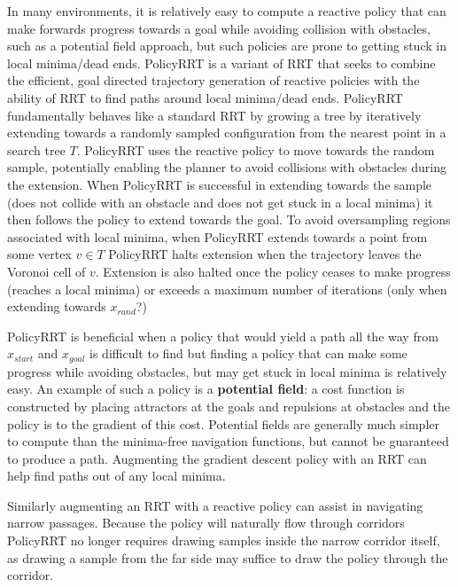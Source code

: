 \documentclass[../thesis.tex]{subfiles}
\begin{document}
In many environments, it is relatively easy to compute a reactive policy that can make forwards progress towards a goal while avoiding collision with obstacles, such as a potential field approach, but such policies are prone to getting stuck in local minima/dead ends.  PolicyRRT is a variant of RRT that seeks to combine the efficient, goal directed trajectory generation of reactive policies with the ability of RRT to find paths around local minima/dead ends.  PolicyRRT fundamentally behaves like a standard RRT by growing a tree by iteratively extending towards a randomly sampled configuration from the nearest point in a search tree $T$.  PolicyRRT uses the reactive policy to move towards the random sample, potentially enabling the planner to avoid collisions with obstacles during the extension.  When PolicyRRT is successful in extending towards the sample (does not collide with an obstacle and does not get stuck in a local minima) it then follows the policy to extend towards the goal.  To avoid oversampling regions associated with local minima, when PolicyRRT extends towards a point from some vertex $v \in T$ PolicyRRT halts extension when the trajectory leaves the Voronoi cell of $v$.  Extension is also halted once the policy ceases to make progress (reaches a local minima) or exceeds a maximum number of iterations (only when extending towards $x_{rand}$?)

PolicyRRT is beneficial when a policy that would yield a path all the way from $x_{start}$ and $x_{goal}$ is difficult to find but finding a policy that can make some progress while avoiding obstacles, but may get stuck in local minima is relatively easy. An example of such a policy is a \textbf{potential field}: a cost function is constructed by placing attractors at the goals and repulsions at obstacles and the policy is to the gradient of this cost.  Potential fields are generally much simpler to compute than the minima-free navigation functions, but cannot be guaranteed to produce a path.  Augmenting the gradient descent policy with an RRT can help find paths out of any local minima.

Similarly augmenting an RRT with a reactive policy can assist in navigating narrow passages.  Because the policy will naturally flow through corridors PolicyRRT no longer requires drawing samples inside the narrow corridor itself, as drawing a sample from the far side may suffice to draw the policy through the corridor.
\end{document}
